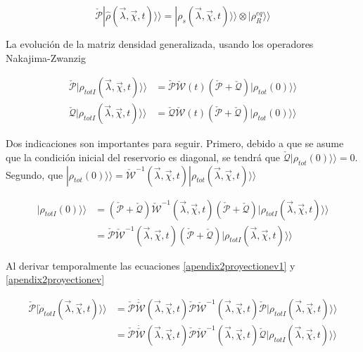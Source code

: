 \begin{appendixs}
\begin{equation*}
    \check{\mathcal{P}}|\hat{\rho}(\vec{\lambda},\vec{\chi},t) \rangle \rangle = |\rho_{s}(\vec{\lambda},\vec{\chi},t)\rangle \rangle \otimes |\rho^{eq}_{R}\rangle \rangle 
\end{equation*}

La evolución de la matriz densidad generalizada, usando los operadores Nakajima-Zwanzig

\begin{align}
    \check{\mathcal{P}}|\rho_{totI}(\vec{\lambda},\vec{\chi},t)\rangle \rangle & =  \check{\mathcal{P}} \check{\mathcal{W}}(t)( \check{\mathcal{P}} +  \check{\mathcal{Q}})|\rho_{tot}(0)\rangle \rangle  \label{apendix2proyectionev1} \\
    \check{\mathcal{Q}}|\rho_{totI}(\vec{\lambda},\vec{\chi},t)\rangle \rangle & = \check{\mathcal{Q}} \check{\mathcal{W}}(t)( \check{\mathcal{P}} +  \check{\mathcal{Q}})|\rho_{tot}(0)\rangle \rangle 
\label{apendix2proyectionev}
\end{align}

Dos indicaciones son importantes para seguir. Primero, debido a que se asume que la condición inicial del reservorio es diagonal, se tendrá que $\check{\mathcal{Q}}|\rho_{tot}(0)\rangle\rangle = 0 $. Segundo, 
 que $|\rho_{tot}(0)\rangle \rangle = \check{\mathcal{W}}^{-1}(\vec{\lambda},\vec{\chi},t)|\rho_{tot}(\vec{\lambda},\vec{\chi},t)\rangle \rangle$

\begin{align*}
    |\rho_{totI}(0)\rangle \rangle & = (\check{\mathcal{P}} + \check{\mathcal{Q}} )\check{\mathcal{W}}^{-1}(\vec{\lambda},\vec{\chi},t)(\check{\mathcal{P}} + \check{\mathcal{Q}})|\rho_{totI}(\vec{\lambda},\vec{\chi},t)\rangle \rangle \\
        & = \check{\mathcal{P}}\check{\mathcal{W}}^{-1}(\vec{\lambda},\vec{\chi},t)(\check{\mathcal{P}} + \check{\mathcal{Q}})|\rho_{totI}(\vec{\lambda},\vec{\chi},t)\rangle \rangle
\end{align*}

Al derivar temporalmente las ecuaciones \ref{apendix2proyectionev1} y \ref{apendix2proyectionev} 

\begin{align*}
    \check{\mathcal{P}}|\dot{\rho}_{totI}(\vec{\lambda},\vec{\chi},t) \rangle \rangle & = \check{\mathcal{P}}\dot{\check{\mathcal{W}}}(\vec{\lambda},\vec{\chi},t)\check{\mathcal{P}}\check{\mathcal{W}}^{-1}(\vec{\lambda},\vec{\chi},t)\check{\mathcal{P}}|\rho_{totI}(\vec{\lambda},\vec{\chi},t)\rangle \rangle \\
     & = \check{\mathcal{P}}\dot{\check{\mathcal{W}}}(\vec{\lambda},\vec{\chi},t)\check{\mathcal{P}}\check{\mathcal{W}}^{-1}(\vec{\lambda},\vec{\chi},t)\check{\mathcal{Q}}|\rho_{totI}(\vec{\lambda},\vec{\chi},t)\rangle \rangle 
\end{align*}


\end{appendixs}
